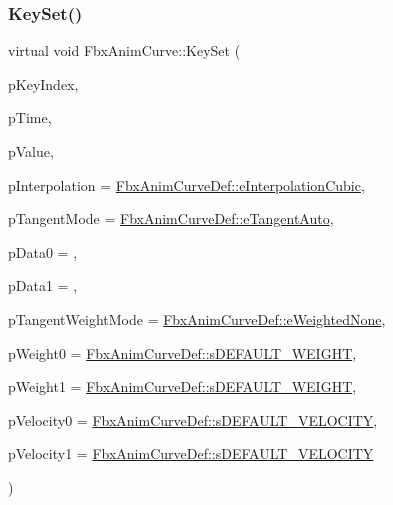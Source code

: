 \subsubsection{\texorpdfstring{Key\+Set()}{KeySet()}\hspace{0.1cm}{\footnotesize\ttfamily [2/2]}}
{\footnotesize\ttfamily virtual void Fbx\+Anim\+Curve\+::\+Key\+Set (\begin{DoxyParamCaption}\item[{int}]{p\+Key\+Index,  }\item[{\hyperlink{class_fbx_time}{Fbx\+Time}}]{p\+Time,  }\item[{float}]{p\+Value,  }\item[{\hyperlink{class_fbx_anim_curve_def_add2ab7d10d856ab0868cc9b143d59ea5}{Fbx\+Anim\+Curve\+Def\+::\+E\+Interpolation\+Type}}]{p\+Interpolation = {\ttfamily \hyperlink{class_fbx_anim_curve_def_add2ab7d10d856ab0868cc9b143d59ea5a16ef50fcdbb8ae99246f06e12f9d3dae}{Fbx\+Anim\+Curve\+Def\+::e\+Interpolation\+Cubic}},  }\item[{\hyperlink{class_fbx_anim_curve_def_ac810ccc5ca0527704ab5175479964b87}{Fbx\+Anim\+Curve\+Def\+::\+E\+Tangent\+Mode}}]{p\+Tangent\+Mode = {\ttfamily \hyperlink{class_fbx_anim_curve_def_ac810ccc5ca0527704ab5175479964b87a56e3bad364851277281e94e81327dd25}{Fbx\+Anim\+Curve\+Def\+::e\+Tangent\+Auto}},  }\item[{float}]{p\+Data0 = {},  }\item[{float}]{p\+Data1 = {},  }\item[{\hyperlink{class_fbx_anim_curve_def_aeee6e9cc12501e10dbd3e5caaf66990e}{Fbx\+Anim\+Curve\+Def\+::\+E\+Weighted\+Mode}}]{p\+Tangent\+Weight\+Mode = {\ttfamily \hyperlink{class_fbx_anim_curve_def_aeee6e9cc12501e10dbd3e5caaf66990ea2ae55a3ceae7773d899ebfae26dcbef3}{Fbx\+Anim\+Curve\+Def\+::e\+Weighted\+None}},  }\item[{float}]{p\+Weight0 = {\ttfamily \hyperlink{class_fbx_anim_curve_def_a6fd6b3907962eba0b1e71f28b55fad9d}{Fbx\+Anim\+Curve\+Def\+::s\+D\+E\+F\+A\+U\+L\+T\+\_\+\+W\+E\+I\+G\+HT}},  }\item[{float}]{p\+Weight1 = {\ttfamily \hyperlink{class_fbx_anim_curve_def_a6fd6b3907962eba0b1e71f28b55fad9d}{Fbx\+Anim\+Curve\+Def\+::s\+D\+E\+F\+A\+U\+L\+T\+\_\+\+W\+E\+I\+G\+HT}},  }\item[{float}]{p\+Velocity0 = {\ttfamily \hyperlink{class_fbx_anim_curve_def_abebd0a6078f18802836059fdefb36862}{Fbx\+Anim\+Curve\+Def\+::s\+D\+E\+F\+A\+U\+L\+T\+\_\+\+V\+E\+L\+O\+C\+I\+TY}},  }\item[{float}]{p\+Velocity1 = {\ttfamily \hyperlink{class_fbx_anim_curve_def_abebd0a6078f18802836059fdefb36862}{Fbx\+Anim\+Curve\+Def\+::s\+D\+E\+F\+A\+U\+L\+T\+\_\+\+V\+E\+L\+O\+C\+I\+TY}} }\end{DoxyParamCaption})\hspace{0.3cm}{\ttfamily [pure virtual]}}

